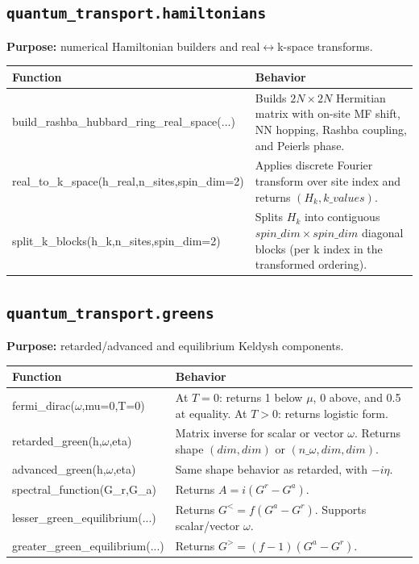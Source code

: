 \documentclass[11pt,a4paper]{article}
\begin{document}
\subsection{\texttt{quantum\_transport.hamiltonians}}
\textbf{Purpose:} numerical Hamiltonian builders and real\(\leftrightarrow\)k-space transforms.

\begin{longtable}{>{\ttfamily}p{} p{}}
\toprule
Function & Behavior \\
\midrule
\endhead
build\_rashba\_hubbard\_ring\_real\_space(...) & Builds \(2N\times2N\) Hermitian matrix with on-site MF shift, NN hopping, Rashba coupling, and Peierls phase. \\
real\_to\_k\_space(h\_real,n\_sites,spin\_dim=2) & Applies discrete Fourier transform over site index and returns \((H_k, k\_values)\). \\
split\_k\_blocks(h\_k,n\_sites,spin\_dim=2) & Splits \(H_k\) into contiguous \(spin\_dim\times spin\_dim\) diagonal blocks (per k index in the transformed ordering). \\
\bottomrule
\end{longtable}

\subsection{\texttt{quantum\_transport.greens}}
\textbf{Purpose:} retarded/advanced and equilibrium Keldysh components.

\begin{longtable}{>{\ttfamily}p{} p{}}
\toprule
Function & Behavior \\
\midrule
\endhead
fermi\_dirac(\(\omega\),mu=0,T=0) & At \(T=0\): returns 1 below \(\mu\), 0 above, and 0.5 at equality. At \(T>0\): returns logistic form. \\
retarded\_green(h,\(\omega\),eta) & Matrix inverse for scalar or vector \(\omega\). Returns shape \((dim,dim)\) or \((n\_\omega,dim,dim)\). \\
advanced\_green(h,\(\omega\),eta) & Same shape behavior as retarded, with \(-i\eta\). \\
spectral\_function(G\_r,G\_a) & Returns \(A=i(G^r-G^a)\). \\
lesser\_green\_equilibrium(...) & Returns \(G^<=f(G^a-G^r)\). Supports scalar/vector \(\omega\). \\
greater\_green\_equilibrium(...) & Returns \(G^>=(f-1)(G^a-G^r)\). \\
\bottomrule
\end{longtable}
\end{document}
